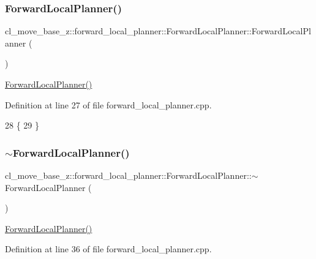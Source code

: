 \subsubsection{\texorpdfstring{Forward\+Local\+Planner()}{ForwardLocalPlanner()}}
{\footnotesize\ttfamily cl\+\_\+move\+\_\+base\+\_\+z\+::forward\+\_\+local\+\_\+planner\+::\+Forward\+Local\+Planner\+::\+Forward\+Local\+Planner (\begin{DoxyParamCaption}{ }\end{DoxyParamCaption})}

\hyperlink{classcl__move__base__z_1_1forward__local__planner_1_1ForwardLocalPlanner_a864c600e6485886702a5d284f8ef4d4b}{Forward\+Local\+Planner()} 

Definition at line 27 of file forward\+\_\+local\+\_\+planner.\+cpp.


\begin{DoxyCode}
28 \{
29 \}
\end{DoxyCode}
\mbox{\label{classcl__move__base__z_1_1forward__local__planner_1_1ForwardLocalPlanner_a75fa72309f991772b56a6bc0f6b6b43f}} 
\subsubsection{\texorpdfstring{$\sim$\+Forward\+Local\+Planner()}{~ForwardLocalPlanner()}}
{\footnotesize\ttfamily cl\+\_\+move\+\_\+base\+\_\+z\+::forward\+\_\+local\+\_\+planner\+::\+Forward\+Local\+Planner\+::$\sim$\+Forward\+Local\+Planner (\begin{DoxyParamCaption}{ }\end{DoxyParamCaption})\hspace{0.3cm}{\ttfamily [virtual]}}

\hyperlink{classcl__move__base__z_1_1forward__local__planner_1_1ForwardLocalPlanner_a864c600e6485886702a5d284f8ef4d4b}{Forward\+Local\+Planner()} 

Definition at line 36 of file forward\+\_\+local\+\_\+planner.\+cpp.


